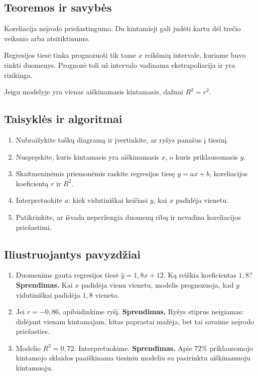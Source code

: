\subsection{Teoremos ir savybės}
\begin{savybe}
Koreliacija neįrodo priežastingumo. Du kintamieji gali judėti kartu dėl trečio veiksnio arba atsitiktinumo.
\end{savybe}
\begin{savybe}
Regresijos tiesė tinka prognozuoti tik tame \(x\) reikšmių intervale, kuriame buvo rinkti duomenys. Prognozė toli už intervalo vadinama ekstrapoliacija ir yra rizikinga.
\end{savybe}
\begin{savybe}
Jeigu modelyje yra vienas aiškinamasis kintamasis, dažnai \(R^2=r^2\).
\end{savybe}

\subsection{Taisyklės ir algoritmai}
\begin{enumerate}[label=\arabic*.]
\item Nubraižykite taškų diagramą ir įvertinkite, ar ryšys panašus į tiesinį.
\item Nuspręskite, kuris kintamasis yra aiškinamasis \(x\), o kuris priklausomasis \(y\).
\item Skaitmeninėmis priemonėmis raskite regresijos tiesę \(y=ax+b\), koreliacijos koeficientą \(r\) ir \(R^2\).
\item Interpretuokite \(a\): kiek vidutiniškai keičiasi \(y\), kai \(x\) padidėja vienetu.
\item Patikrinkite, ar išvada neperžengia duomenų ribų ir nevadina koreliacijos priežastimi.
\end{enumerate}

\subsection{Iliustruojantys pavyzdžiai}
\begin{enumerate}[label=\arabic*.]
\item Duomenims gauta regresijos tiesė \(\hat y=1{,}8x+12\). Ką reiškia koeficientas \(1{,}8\)?
\textbf{Sprendimas.} Kai \(x\) padidėja vienu vienetu, modelis prognozuoja, kad \(y\) vidutiniškai padidėja \(1{,}8\) vieneto.

\item Jei \(r=-0{,}86\), apibūdinkime ryšį.
\textbf{Sprendimas.} Ryšys stiprus neigiamas: didėjant vienam kintamajam, kitas paprastai mažėja, bet tai savaime neįrodo priežasties.

\item Modelio \(R^2=0{,}72\). Interpretuokime.
\textbf{Sprendimas.} Apie \(72\%\) priklausomojo kintamojo sklaidos paaiškinama tiesiniu modeliu su pasirinktu aiškinamuoju kintamuoju.
\end{enumerate}

